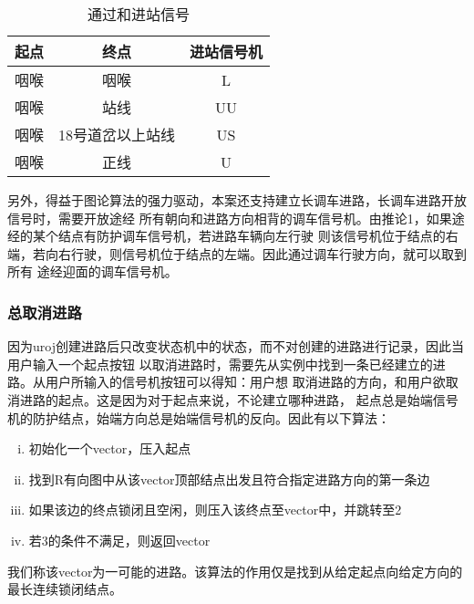 \begin{table}[htpb!]
    \centering
    \caption{\label{homw_light}通过和进站信号}
    \begin{threeparttable}
        \begin{tabular}{ccc}
            \toprule
            起点 & 终点             & 进站信号机 \\
            \midrule
            咽喉 & 咽喉             & L          \\
            咽喉 & 站线             & UU         \\
            咽喉 & 18号道岔以上站线 & US         \\
            咽喉 & 正线             & U          \\
            \bottomrule
        \end{tabular}
    \end{threeparttable}
\end{table}

另外，得益于图论算法的强力驱动，本案还支持建立长调车进路，长调车进路开放信号时，需要开放途经
所有朝向和进路方向相背的调车信号机。由推论1，如果途经的某个结点有防护调车信号机，若进路车辆向左行驶
则该信号机位于结点的右端，若向右行驶，则信号机位于结点的左端。因此通过调车行驶方向，就可以取到所有
途经迎面的调车信号机。

\subsubsection{总取消进路}
因为uroj创建进路后只改变状态机中的状态，而不对创建的进路进行记录，因此当用户输入一个起点按钮
以取消进路时，需要先从实例中找到一条已经建立的进路。从用户所输入的信号机按钮可以得知：用户想
取消进路的方向，和用户欲取消进路的起点。这是因为对于起点来说，不论建立哪种进路，
起点总是始端信号机的防护结点，始端方向总是始端信号机的反向。因此有以下算法：

\begin{enumerate}[i.]
    \item 初始化一个vector，压入起点
    \item 找到R有向图中从该vector顶部结点出发且符合指定进路方向的第一条边
    \item 如果该边的终点锁闭且空闲，则压入该终点至vector中，并跳转至2
    \item 若3的条件不满足，则返回vector
\end{enumerate}

我们称该vector为一可能的进路。该算法的作用仅是找到从给定起点向给定方向的最长连续锁闭结点。


